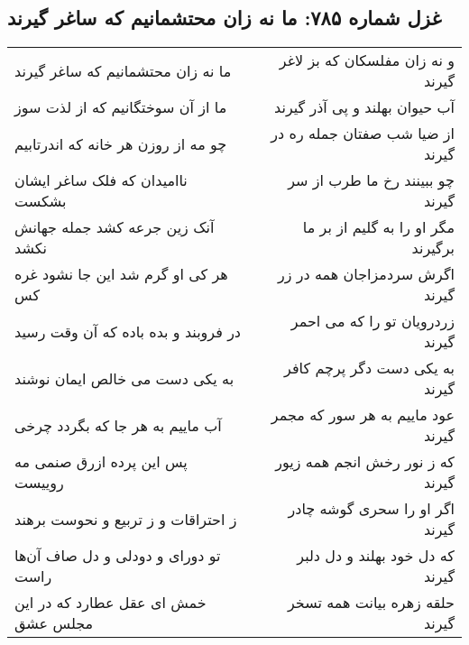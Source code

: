 \begin{center}
\section*{غزل شماره ۷۸۵: ما نه زان محتشمانیم که ساغر گیرند}
\label{sec:0785}
\begin{longtable}{l p{0.5cm} r}
ما نه زان محتشمانیم که ساغر گیرند
&&
و نه زان مفلسکان که بز لاغر گیرند
\\
ما از آن سوختگانیم که از لذت سوز
&&
آب حیوان بهلند و پی آذر گیرند
\\
چو مه از روزن هر خانه که اندرتابیم
&&
از ضیا شب صفتان جمله ره در گیرند
\\
ناامیدان که فلک ساغر ایشان بشکست
&&
چو ببینند رخ ما طرب از سر گیرند
\\
آنک زین جرعه کشد جمله جهانش نکشد
&&
مگر او را به گلیم از بر ما برگیرند
\\
هر کی او گرم شد این جا نشود غره کس
&&
اگرش سردمزاجان همه در زر گیرند
\\
در فروبند و بده باده که آن وقت رسید
&&
زردرویان تو را که می احمر گیرند
\\
به یکی دست می خالص ایمان نوشند
&&
به یکی دست دگر پرچم کافر گیرند
\\
آب ماییم به هر جا که بگردد چرخی
&&
عود ماییم به هر سور که مجمر گیرند
\\
پس این پرده ازرق صنمی مه روییست
&&
که ز نور رخش انجم همه زیور گیرند
\\
ز احتراقات و ز تربیع و نحوست برهند
&&
اگر او را سحری گوشه چادر گیرند
\\
تو دورای و دودلی و دل صاف آن‌ها راست
&&
که دل خود بهلند و دل دلبر گیرند
\\
خمش ای عقل عطارد که در این مجلس عشق
&&
حلقه زهره بیانت همه تسخر گیرند
\\
\end{longtable}
\end{center}
